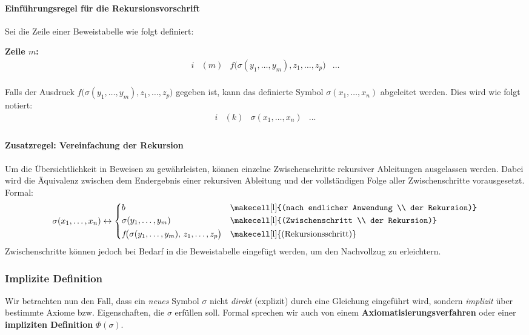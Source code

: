 \documentclass[main.tex]{subfiles}
\begin{document}
\paragraph{Einführungsregel für die Rekursionsvorschrift}
Sei die Zeile einer Beweistabelle wie folgt definiert:

\textbf{Zeile \(m\):}
\[
\begin{array}{llll}
   i & (m) & f\big(\sigma(y_1, \ldots, y_m), z_1, \ldots, z_p\big) & \dots \\
\end{array}
\]

Falls der Ausdruck \(f\big(\sigma(y_1, \ldots, y_m), z_1, \ldots, z_p\big)\) gegeben ist, kann das definierte Symbol \(\sigma(x_1, \ldots, x_n)\) abgeleitet werden. Dies wird wie folgt notiert:
\[
\begin{array}{llll}
   i & (k) & \sigma(x_1, \ldots, x_n) & ... \\
\end{array}
\]

\paragraph{Zusatzregel: Vereinfachung der Rekursion}
Um die Übersichtlichkeit in Beweisen zu gewährleisten, können einzelne Zwischenschritte rekursiver Ableitungen ausgelassen werden. Dabei wird die Äquivalenz zwischen dem Endergebnis einer rekursiven Ableitung und der vollständigen Folge aller Zwischenschritte vorausgesetzt. Formal:
\[
\sigma(x_1, \ldots, x_n) \leftrightarrow
\left\{
\begin{alignedat}{2}
  & b && \quad \text{\makecell[l]{(nach endlicher Anwendung \\ der Rekursion)}}\\
  & \sigma(y_1, \ldots, y_m) && \quad \text{\makecell[l]{(Zwischenschritt \\ der Rekursion)}}\\
  & f\!\bigl(\sigma(y_1, \ldots, y_m),\, z_1, \ldots, z_p\bigr)
  && \quad \text{\makecell[l]{(Rekursionsschritt)}}
\end{alignedat}
\right.
\]
Zwischenschritte können jedoch bei Bedarf in die Beweistabelle eingefügt werden, um den Nachvollzug zu erleichtern.


\subsubsection{Implizite Definition}
Wir betrachten nun den Fall, dass ein \emph{neues} Symbol \(\sigma\) nicht \emph{direkt} (explizit) durch eine Gleichung eingeführt wird, sondern \emph{implizit} über bestimmte Axiome bzw. Eigenschaften, die \(\sigma\) erfüllen soll. Formal sprechen wir auch von einem \textbf{Axiomatisierungsverfahren} oder einer \textbf{impliziten Definition} \(\Phi(\sigma)\).
\end{document}
